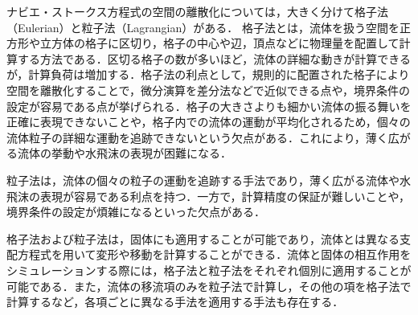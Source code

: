 \documentclass[a4j,12pt]{jreport}
\begin{document}
ナビエ・ストークス方程式の空間の離散化については，大きく分けて格子法（Eulerian）と粒子法（Lagrangian）がある．
格子法とは，流体を扱う空間を正方形や立方体の格子に区切り，格子の中心や辺，頂点などに物理量を配置して計算する方法である．区切る格子の数が多いほど，流体の詳細な動きが計算できるが，計算負荷は増加する．格子法の利点として，規則的に配置された格子により空間を離散化することで，微分演算を差分法などで近似できる点や，境界条件の設定が容易である点が挙げられる．格子の大きさよりも細かい流体の振る舞いを正確に表現できないことや，格子内での流体の運動が平均化されるため，個々の流体粒子の詳細な運動を追跡できないという欠点がある．これにより，薄く広がる流体の挙動や水飛沫の表現が困難になる．

粒子法は，流体の個々の粒子の運動を追跡する手法であり，薄く広がる流体や水飛沫の表現が容易である利点を持つ．一方で，計算精度の保証が難しいことや，境界条件の設定が煩雑になるといった欠点がある．

格子法および粒子法は，固体にも適用することが可能であり，流体とは異なる支配方程式を用いて変形や移動を計算することができる．流体と固体の相互作用をシミュレーションする際には，格子法と粒子法をそれぞれ個別に適用することが可能である．また，流体の移流項のみを粒子法で計算し，その他の項を格子法で計算するなど，各項ごとに異なる手法を適用する手法も存在する．
\end{document}
